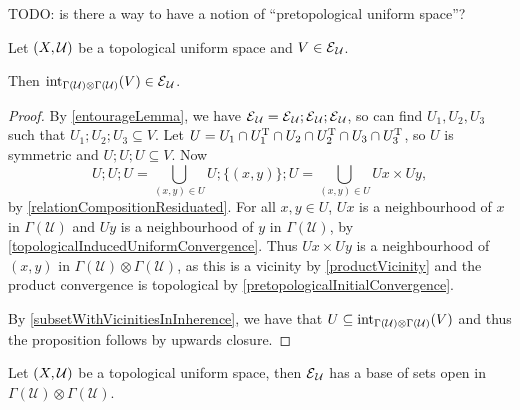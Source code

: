 TODO: is there a way to have a notion of ``pretopological uniform space''?

\begin{proposition}
Let $\left( X,\mathcal{U} \right)$ be a topological uniform space and $V\in \operatorname{\mathcal{E}}_\mathcal{U}$.

Then $\operatorname{int}_{\Gamma(\mathcal{U})\otimes \Gamma(\mathcal{U})}(V) \in \operatorname{\mathcal{E}}_\mathcal{U}$.
\end{proposition}
\begin{proof}
By \ref{entourageLemma}, we have $\operatorname{\mathcal{E}}_\mathcal{U} = \operatorname{\mathcal{E}}_\mathcal{U};\operatorname{\mathcal{E}}_\mathcal{U};\operatorname{\mathcal{E}}_\mathcal{U}$, so can find $U_1,U_2,U_3$ such that $U_1;U_2;U_3 \subseteq V$. Let $U = U_1\cap U_1^{\mathrm{T}} \cap U_2 \cap U_2^{\mathrm{T}} \cap U_3\cap U_3^{\mathrm{T}}$, so $U$ is symmetric and $U;U;U\subseteq V$.
Now
\[ U;U;U = \bigcup_{(x,y)\in U}U;\{(x, y)\};U = \bigcup_{(x,y)\in U}Ux \times Uy, \]
by \ref{relationCompositionResiduated}. For all $x,y\in U$, $Ux$ is a neighbourhood of $x$ in $\Gamma(\mathcal{U})$ and $Uy$ is a neighbourhood of $y$ in $\Gamma(\mathcal{U})$, by \ref{topologicalInducedUniformConvergence}.  Thus $Ux \times Uy$ is a neighbourhood of $(x,y)$ in $\Gamma(\mathcal{U})\otimes \Gamma(\mathcal{U})$, as this is a vicinity by \ref{productVicinity} and the product convergence is topological by \ref{pretopologicalInitialConvergence}.

By \ref{subsetWithVicinitiesInInherence}, we have that $U\subseteq \operatorname{int}_{\Gamma(\mathcal{U})\otimes \Gamma(\mathcal{U})}(V)$ and thus the proposition follows by upwards closure.
\end{proof}
\begin{corollary}
Let $\left( X,\mathcal{U} \right)$ be a topological uniform space, then $\operatorname{\mathcal{E}}_\mathcal{U}$ has a base of sets open in $\Gamma(\mathcal{U})\otimes \Gamma(\mathcal{U})$.
\end{corollary}

